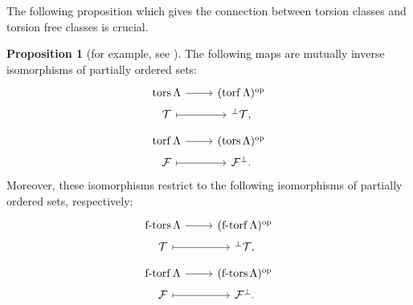 \documentclass[pdftex,a4paper]{article}
\numberwithin{equation}{subsection}
\theoremstyle{definition}
\newtheorem{proposition}[theorem]{Proposition}
\newcommand{\opo}{\operatorname{\mathrm{op}}}
\newcommand{\tors}{\operatorname{\mathrm{tors}}}
\newcommand{\torf}{\operatorname{\mathrm{torf}}}
\newcommand{\ftors}{\operatorname{\mathrm{f-tors}}}
\newcommand{\ftorf}{\operatorname{\mathrm{f-torf}}}
\begin{document}
The following proposition which gives the connection between torsion classes and torsion free classes is crucial.

\begin{proposition}[{for example, see \cite{MR2197389}}]\label{dualtorsf 2021-12-16 16:31:45}
	The following maps are mutually inverse isomorphisms of partially ordered sets:
	\begin{equation}
		\begin{tikzcd}[row sep=1pt]
			\tors \Lambda \ar[r]& (\torf \Lambda)^{\opo}\\
			\mathcal{T}\ar[r,mapsto]& {}^{\perp}\mathcal{T},
		\end{tikzcd}
	\end{equation}
	\begin{equation}
		\begin{tikzcd}[row sep=1pt]
			\torf \Lambda \ar[r]& (\tors \Lambda)^{\opo}\\
			\mathcal{F}\ar[r,mapsto]& \mathcal{F}^{\perp}.
		\end{tikzcd}
	\end{equation}
	Moreover, these isomorphisms restrict to the following isomorphisms of partially ordered sets, respectively:
	\begin{equation}\label{gal}
		\begin{tikzcd}[row sep=1pt]
			\ftors \Lambda \ar[r]&(\ftorf \Lambda)^{\opo}\\
			\mathcal{T}\ar[r,mapsto]& {}^{\perp} \mathcal{T},
		\end{tikzcd}
	\end{equation}
	\begin{equation}\label{gali}
		\begin{tikzcd}[row sep=1pt]
			\ftorf \Lambda \ar[r]&(\ftors \Lambda)^{\opo}\\
			\mathcal{F}\ar[r,mapsto]& \mathcal{F}^{\perp}.
		\end{tikzcd}
	\end{equation}
\end{proposition}
\end{document}
